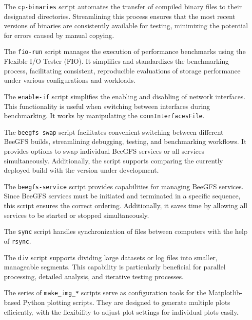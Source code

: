 The \texttt{cp-binaries} script automates the transfer of compiled binary files to their designated directories. Streamlining this process ensures that the most recent versions of binaries are consistently available for testing, minimizing the potential for errors caused by manual copying.

The \texttt{fio-run} script manages the execution of performance benchmarks using the Flexible I/O Tester (FIO). It simplifies and standardizes the benchmarking process, facilitating consistent, reproducible evaluations of storage performance under various configurations and workloads.

The \texttt{enable-if} script simplifies the enabling and disabling of network interfaces. This functionality is useful when switching between interfaces during benchmarking. It works by manipulating the \texttt{connInterfacesFile}.

The \texttt{beegfs-swap} script facilitates convenient switching between different BeeGFS builds, streamlining debugging, testing, and benchmarking workflows. It provides options to swap individual BeeGFS services or all services simultaneously. Additionally, the script supports comparing the currently deployed build with the version under development.

The \texttt{beegfs-service} script provides capabilities for managing BeeGFS services. Since BeeGFS services must be initiated and terminated in a specific sequence, this script ensures the correct ordering. Additionally, it saves time by allowing all services to be started or stopped simultaneously.

The \texttt{sync} script handles synchronization of files between computers with the help of \texttt{rsync}.

The \texttt{div} script supports dividing large datasets or log files into smaller, manageable segments. This capability is particularly beneficial for parallel processing, detailed analysis, and iterative testing processes.

The series of \texttt{make\_img\_*} scripts serve as configuration tools for the Matplotlib-based Python plotting scripts. They are designed to generate multiple plots efficiently, with the flexibility to adjust plot settings for individual plots easily.

